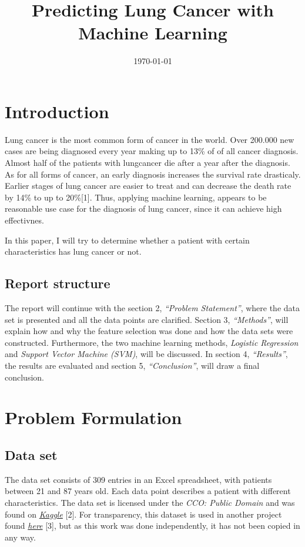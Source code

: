 \documentclass[a4paper,12pt]{article}
\date{\today}
\title{Predicting Lung Cancer with Machine Learning}
\begin{document}
\maketitle
\section{Introduction}
\label{sec:orgd96f841}
Lung cancer is the most common form of cancer in the world. Over 200.000 new cases are being diagnosed every year making up to 13\% of of all cancer diagnosis. Almost half of the patients with lungcancer die after a year after the diagnosis.
As for all forms of cancer, an early diagnosis increases the survival rate drasticaly. Earlier stages of lung cancer are easier to treat and can decrease the death rate by 14\% to up to 20\%[1].
Thus, applying machine learning, appears to be reasonable use case for the diagnosis of lung cancer, since it can achieve high effectivnes.

In this paper, I will try to determine whether a patient with certain characteristics has lung cancer or not.

\subsection{Report structure}
\label{sec:org8ae6fab}
The report will continue with the section 2, \emph{``Problem Statement''}, where the data set is presented and all the data points are clarified.
Section 3, \emph{``Methods''}, will explain how and why the feature selection was done and how the data sets were constructed.
Furthermore, the two machine learning methods, \emph{Logistic Regression} and \emph{Support Vector Machine (SVM)}, will be discussed.
In section 4, \emph{``Results''}, the results are evaluated and section 5, \emph{``Conclusion''}, will draw a final conclusion.

\section{Problem Formulation}
\label{sec:org77a5b9c}

\subsection{Data set}
\label{sec:org0ece619}
The data set consists of 309 entries in an Excel spreadsheet, with patients between 21 and 87 years old.
Each data point describes a patient with different characteristics.
The data set is licensed under the \emph{CCO: Public Domain} and was found on \emph{\href{https://www.kaggle.com/datasets/mysarahmadbhat/lung-cancer}{Kaggle}} [2].
For transparency, this dataset is used in another project found \emph{\href{https://www.kaggle.com/code/gaganmaahi224/lung-cancer-5ml-models-full-analysis-plotly}{here}} [3], but as this work was done independently, it has not been copied in any way.
\end{document}

